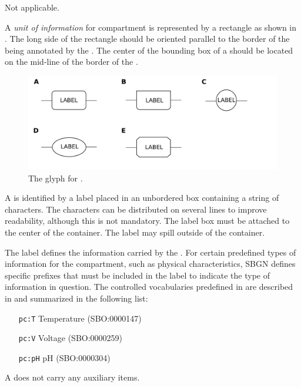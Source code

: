 \begin{glyphDescription}

\glyphSboTerm Not applicable.

\glyphContainer A \emph{unit of information} for compartment is represented by a rectangle as shown in .  The long side of the rectangle should be oriented parallel to the border of the  being annotated by the . The center of the bounding box of a  should be located on the mid-line of the border of the .

\begin{figure}[H]
  \centering
  \includegraphics[scale = 0.3]{images/unitInformation}
  \caption{The \AF glyph for .}
  \label{fig:compunitInfo}
\end{figure}

\glyphLabel A  is identified by a label placed in an unbordered box containing a string of characters.  The characters can be distributed on several lines to improve readability, although this is not mandatory.  The label box must be attached to the center of the container.  The label may spill outside of the container.

The label defines the information carried by the .  For certain predefined types of information for the compartment, such as physical characteristics, SBGN defines specific prefixes that must be included in the label to indicate the type of information in question.  The controlled vocabularies predefined in \SBGNAFLone are described in  and summarized in the following list:

\begin{center}
  \begin{itemize}\setlength{\parskip}{0ex}
  \item[\texttt{pc:T}] Temperature (SBO:0000147)
  \item[\texttt{pc:V}] Voltage (SBO:0000259)
  \item[\texttt{pc:pH}] pH (SBO:0000304)
  \end{itemize}
\end{center}

    
\glyphAux A  does not carry any auxiliary items.  

\end{glyphDescription}


